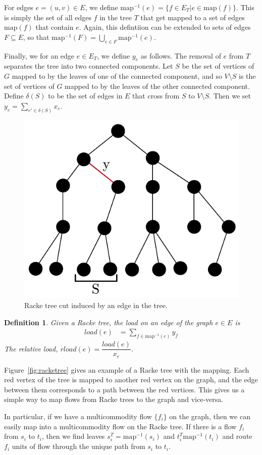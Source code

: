 \documentclass[12pt]{article}
\newtheorem{definition}{Definition}
\begin{document}
For edges $e = (u,v) \in E$, we define $\mathrm{map}^{-1}(e) = \{ f \in E_T | e \in \mathrm{map}(f)\}$. This is simply the set of all edges $f$ in the tree $T$ that get mapped to a set of edges $\mathrm{map}(f)$ that contain $e$. Again, this defintiion can be extended to sets of edges $F \subseteq E$, so that $\mathrm{map}^{-1}(F) = \bigcup_{e \in F} \mathrm{map}^{-1}(e)$.

Finally, we for an edge $e \in E_T$, we define $y_e$ as follows. The removal of $e$ from $T$ separates the tree into two connected components. Let $S$ be the set of vertices of $G$ mapped to by the leaves of one of the connected component, and so $V \setminus S$ is the set of vertices of $G$ mapped to by the leaves of the other connected component. Define $\delta(S)$ to be the set of edges in $E$ that cross from $S$ to $V \setminus S$. Then we set $y_e = \sum_{e' \in \delta(S)} x_e$.

\begin{figure}
\centering
\label{fig:rackecut}
\includegraphics[width=0.5\linewidth]{Rackecut.pdf}
\caption{Racke tree cut induced by an edge in the tree.}
\end{figure}

\begin{definition}
Given a Racke tree, the load on an edge of the graph $e \in E$ is
\begin{align}
load(e) &= \sum_{f \in \text{map}^{-1}(e)} y_f
\end{align}
The relative load, $rload(e) = \dfrac{load(e)}{x_e}$. 
\end{definition}

Figure~\ref{fig:racketree} gives an example of a Racke tree with the mapping. Each red vertex of the tree is mapped to another red vertex on the graph, and the edge between them corresponds to a path between the red vertices. This gives us a simple way to map flows from Racke trees to the graph and vice-versa. 

In particular, if we have a multicommodity flow $\{ f_i \}$ on the graph, then we can easily map into a multicommodity flow on the Racke tree. If there is a flow $f_i$ from $s_i$ to $t_i$, then we find leaves $s_i^{T}=\text{map}^{-1}(s_i)$ and $t_i^T\text{map}^{-1}(t_i)$ and route $f_i$ units of flow through the unique path from $s_i$ to $t_i$.
\end{document}
